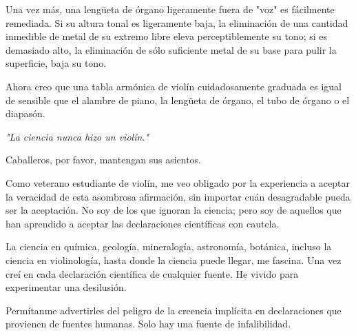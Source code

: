 \documentclass[12pt]{book}
\begin{document}
Una vez más, una lengüeta de órgano ligeramente fuera de "voz" es fácilmente remediada. Si su altura tonal es ligeramente baja, la eliminación de una cantidad inmedible de metal de su extremo libre eleva perceptiblemente su tono; si es demasiado alto, la eliminación de sólo suficiente metal de su base para pulir la superficie, baja su tono.

Ahora creo que una tabla armónica de violín cuidadosamente graduada es igual de sensible que el alambre de piano, la lengüeta de órgano, el tubo de órgano o el diapasón.

\textit{"La ciencia nunca hizo un violín."}

Caballeros, por favor, mantengan sus asientos.

Como veterano estudiante de violín, me veo obligado por la experiencia a aceptar la veracidad de esta asombrosa afirmación, sin importar cuán desagradable pueda ser la aceptación. No soy de los que ignoran la ciencia; pero soy de aquellos que han aprendido a aceptar las declaraciones científicas con cautela.

La ciencia en química, geología, mineralogía, astronomía, botánica, incluso la ciencia en violinología, hasta donde la ciencia puede llegar, me fascina. Una vez creí en cada declaración científica de cualquier fuente. He vivido para experimentar una desilusión.

Permítanme advertirles del peligro de la creencia implícita en declaraciones que provienen de fuentes humanas. Solo hay una fuente de infalibilidad.
\end{document}
